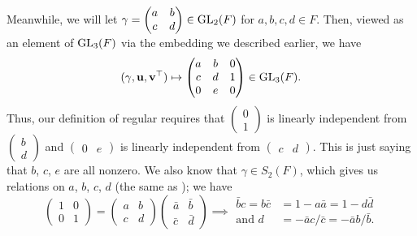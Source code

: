Meanwhile, we will let
$\gamma = \begin{pmatrix} a & b \\ c & d \end{pmatrix} \in \operatorname{GL}_2(F)$
for $a,b,c,d \in F$.
Then, viewed as an element of $\operatorname{GL}_3(F)$ via the embedding we described earlier, we have
\[
  (\gamma, \mathbf u, \mathbf v^\top)
  \mapsto \begin{pmatrix}
    a & b & 0 \\
    c & d & 1 \\
    0 & e & 0
  \end{pmatrix} \in \operatorname{GL}_3(F).
\]
Thus, our definition of regular requires that
$\begin{pmatrix} 0 \\ 1 \end{pmatrix}$
is linearly independent from $\begin{pmatrix} b \\ d \end{pmatrix}$
and
$\begin{pmatrix} 0 & e \end{pmatrix}$
is linearly independent from $\begin{pmatrix} c & d \end{pmatrix}$.
This is just saying that $b$, $c$, $e$ are all nonzero.
We also know that $\gamma \in S_2(F)$, which gives us relations on $a$, $b$, $c$, $d$
(the same as \cite[Equation (7.3.2)]{ref:AFLspherical}); we have
\[
  \begin{pmatrix} 1 & 0 \\ 0 & 1 \end{pmatrix}
  = \begin{pmatrix} a & b \\ c & d \end{pmatrix} \begin{pmatrix} \bar a & \bar b \\ \bar c & \bar d \end{pmatrix}
  \implies
  \begin{aligned}
    \bar b c = b \bar c &= 1 - a \bar a = 1 - d \bar d \\
    \text{and } d &= - \bar a c / \bar c = -\bar a b / \bar b.
  \end{aligned}
\]

